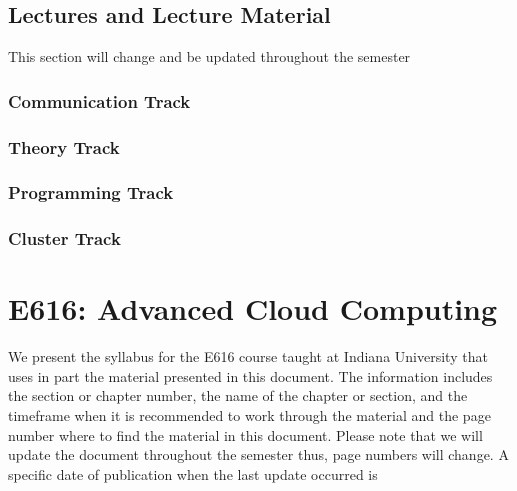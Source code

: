 \section{Lectures and Lecture Material}

\begin{WARNING}
This section will change and be updated throughout the semester
\end{WARNING}

\subsection{Communication Track}


\subsection{Theory Track}



\subsection{Programming Track}

\subsection{Cluster Track}

\chapter{E616: Advanced Cloud Computing}

We present the syllabus for the E616 course taught at Indiana
University that uses in part the material presented in this
document. The information includes the section or chapter number, the
name of the chapter or section, and the timeframe when it is
recommended to work through the material and the page number where to
find the material in this document. Please note that we will update
the document throughout the semester thus, page numbers will change. A
specific date of publication when the last update occurred is

